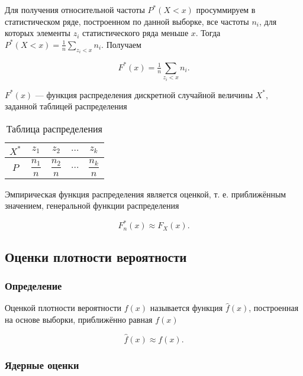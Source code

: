Для получения относительной частоты $P^*(X < x)$ просуммируем в статистическом ряде, построенном по данной выборке, все частоты $n_i$, для которых элементы $z_i$ статистического ряда меньше $x$. Тогда $P^*(X < x) = \tfrac{1}{n}\sum\limits_{z_i < x}n_i$. Получаем

\begin{equation}
    F^*(x) = \tfrac{1}{n}\sum\limits_{z_i < x}n_i.
\end{equation}

$F^*(x)$ --- функция распределения дискретной случайной величины $X^*$, заданной таблицей распределения

\begin{table}[h!]
\begin{center}
\begin{tabular}{|c|c|c|c|c|}
\hline
$X^*$ & $z_1$ & $z_2$ & $...$ & $z_k$ \\
\hline
$P$ & $\dfrac{n_1}{n}$ & $\dfrac{n_2}{n}$ & $...$ & $\dfrac{n_k}{n}$ \\
\hline
\end{tabular}
\end{center}
\caption{Таблица распределения}
\end{table}

Эмпирическая функция распределения является оценкой, т. е. приближённым значением, генеральной функции распределения

\begin{equation}
    F_n^*(x) \approx F_X(x).
\end{equation}

\subsection{Оценки плотности вероятности}

\subsubsection{Определение}

Оценкой плотности вероятности $f(x)$ называется функция $\widehat{f}(x)$, построенная на основе выборки, приближённо равная $f(x)$

\begin{equation}
    \widehat{f}(x) \approx f(x).
\end{equation}

\subsubsection{Ядерные оценки}


